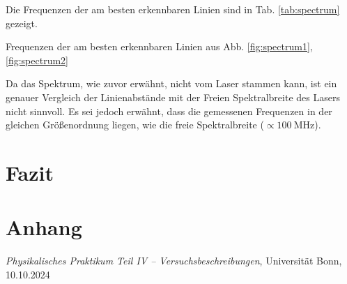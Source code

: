 \documentclass{article}
\newcommand*{\tablePath}{../data} %
\begin{document}
Die Frequenzen der am besten erkennbaren Linien sind in Tab. \ref{tab:spectrum} gezeigt.
\begin{table}[h]
  
  \caption{Frequenzen der am besten erkennbaren Linien aus Abb. \ref{fig:spectrum1}, \ref{fig:spectrum2}}
\end{table}
Da das Spektrum, wie zuvor erwähnt, nicht vom Laser stammen kann, ist ein genauer Vergleich der Linienabstände
mit der Freien Spektralbreite des Lasers nicht sinnvoll. Es sei jedoch erwähnt, dass die gemessenen Frequenzen in
der gleichen Größenordnung liegen, wie die freie Spektralbreite ($\propto \SI{100}{\MHz}$).




\clearpage
\section{Fazit}



\clearpage
\section{Anhang}



\clearpage
\begin{thebibliography}{9}

\textit{Physikalisches Praktikum Teil IV -- Versuchsbeschreibungen}, Universität Bonn, 10.10.2024



\end{thebibliography}
\end{document}

